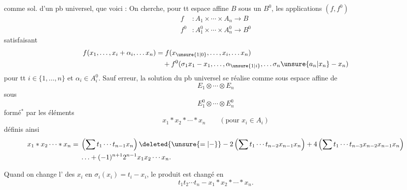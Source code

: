 comme sol. d'un pb universel, que voici : On cherche, pour tt espace affine $B$ sous un  $B^0$, les  applications $(f,f^0)$
\[
 \begin{aligned}
 f &: A_1\times\cdots\times A_n\longrightarrow B\\
 f^0 &: A_1^0\times\cdots\times A_n^0\longrightarrow B^0
 \end{aligned}
\]
satisfaisant
\[
 \begin{aligned}
 f(x_1,\ldots,x_i+\alpha_i,\ldots x_n)&=f(x_{\unsure{1|0}},\ldots,x_i,\ldots x_n)\\
 &\quad+f^0(\sigma_1x_1-x_1,\ldots,\alpha_{\unsure{1|i}},\ldots\sigma_n\unsure{a_n|x_n}-x_n)
 \end{aligned}
\]
pour tt $i\in\{1,\ldots,n\}$ et $\alpha_i\in A_i^0$. Sauf erreur, la solution du pb universel se réalise comme sous espace affine de
\[
 E_1\otimes\cdots\otimes E_n
\]
sous
\[
 E_1^0\otimes\cdots\otimes E_n^0
\]
formé$^*$ par les éléments
\[
 x_1\ast x_2\ast\cdots\ast x_n\qquad(\text{pour }x_i\in A_i)
\]
définis ainsi
\[
 \begin{aligned}
 x_1\ast x_2\cdots\ast x_n={}&\left(\sum t_1\cdots t_{n-1}x_n\right)\deleted{\unsure{=|-}}-2\left(\sum t_1\cdots t_{n-2}x_{n-1}x_n\right)+4\left(\sum t_1\cdots t_{n-3}x_{n-2}x_{n-1}x_n\right)\\
 &\ldots+(-1)^{n+1}2^{n-1}x_1x_2\cdots x_n .
 \end{aligned}
\]

Quand on change l' des $x_i$ en $\sigma_i(x_i)=t_i-x_i$, le produit est changé en
\[
 t_1t_2\cdots t_n-x_1\ast x_2\ast\cdots\ast x_n.
\]

